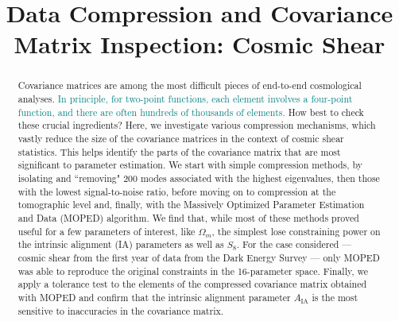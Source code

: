 \documentclass[twocolumn]{\docclass}
\begin{document}
	
	\title{Data Compression and Covariance Matrix Inspection: Cosmic Shear}
	\maketitlepre
	
	\begin{abstract}
		Covariance matrices are among the most difficult pieces of end-to-end cosmological analyses. \textcolor{teal}{In principle, for two-point functions, each element involves a four-point function, and there are often hundreds of thousands of elements.} How best to check these crucial ingredients? Here, we investigate various compression mechanisms, which vastly reduce the size of the covariance matrices in the context of cosmic shear statistics. 
		This helps identify the parts of the covariance matrix that are most significant to parameter estimation. We start with simple compression methods, by isolating and ``removing" 200 modes associated with the highest eigenvalues, then those with the lowest signal-to-noise ratio, before moving on to compression at the tomographic level and, finally, with the Massively Optimized Parameter Estimation and Data (MOPED) algorithm. We find that, while most of these methods proved useful for a few parameters of interest, like $\Omega_m$, the simplest lose constraining power on the intrinsic alignment (IA) parameters as well as $S_8$. %
		For the case considered --- cosmic shear from the first year of data from the Dark Energy Survey --- only MOPED was able to reproduce the original constraints in the 16-parameter space. Finally, we apply a tolerance test to the elements of the compressed covariance matrix obtained with MOPED and confirm that the intrinsic alignment parameter $A_{\mathrm{IA}}$ is the most sensitive to inaccuracies in the covariance matrix.
		

\end{abstract}
\end{document}
